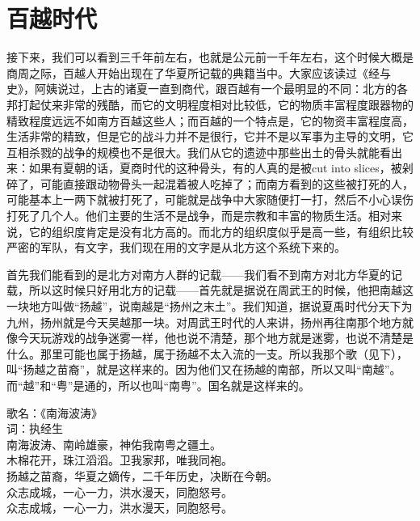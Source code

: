 \section{百越时代}

接下来，我们可以看到三千年前左右，也就是公元前一千年左右，这个时候大概是商周之际，百越人开始出现在了华夏所记载的典籍当中。大家应该读过《经与史》，阿姨说过，上古的诸夏一直到商代，跟百越有一个最明显的不同：北方的各邦打起仗来非常的残酷，而它的文明程度相对比较低，它的物质丰富程度跟器物的精致程度远远不如南方百越这些人；而百越的一个特点是，它的物资丰富程度高，生活非常的精致，但是它的战斗力并不是很行，它并不是以军事为主导的文明，它互相杀戮的战争的规模也不是很大。我们从它的遗迹中那些出土的骨头就能看出来：如果有夏朝的话，夏商时代的这种骨头，有的人真的是被cut into slices，被剁碎了，可能直接跟动物骨头一起混着被人吃掉了；而南方看到的这些被打死的人，可能基本上一两下就被打死了，可能就是战争中大家随便打一打，然后不小心误伤打死了几个人。他们主要的生活不是战争，而是宗教和丰富的物质生活。相对来说，它的组织度肯定是没有北方高的。而北方的组织度似乎是高一些，有组织比较严密的军队，有文字，我们现在用的文字是从北方这个系统下来的。

首先我们能看到的是北方对南方人群的记载——我们看不到南方对北方华夏的记载，所以这时候只好用北方的记载——首先就是据说在周武王的时候，他把南越这一块地方叫做“扬越”，说南越是“扬州之末土”。我们知道，据说夏禹时代分天下为九州，扬州就是今天吴越那一块。对周武王时代的人来讲，扬州再往南那个地方就像今天玩游戏的战争迷雾一样，他也说不清楚，那个地方就是迷雾，也说不清楚是什么。那里可能也属于扬越，属于扬越不太入流的一支。所以我那个歌（见下），叫“扬越之苗裔”，就是这样来的。因为他们又在扬越的南部，所以又叫“南越”。而“越”和“粤”是通的，所以也叫“南粤”。国名就是这样来的。

\begin{quoted}
	歌名：《南海波涛》\\
	词：执经生\\
	南海波涛、南岭雄豪，神佑我南粤之疆土。\\
	木棉花开，珠江滔滔。卫我家邦，唯我同袍。\\
	扬越之苗裔，华夏之嫡传，二千年历史，决断在今朝。\\
	众志成城，一心一力，洪水漫天，同胞怒号。\\
	众志成城，一心一力，洪水漫天，同胞怒号。
\end{quoted}

